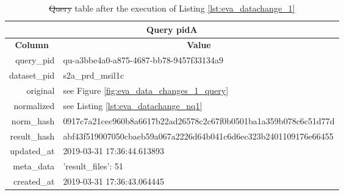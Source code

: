 \documentclass[draft,final]{vutinfth} %
\providecommand{\DIFaddtex}[1]{{\protect\color{blue}\uwave{#1}}} %
\providecommand{\DIFdeltex}[1]{{\protect\color{red}\sout{#1}}}                      %
\providecommand{\DIFaddFL}[1]{\DIFadd{#1}} %
\providecommand{\DIFdelFL}[1]{\DIFdel{#1}} %
\providecommand{\DIFaddbeginFL}{} %
\providecommand{\DIFaddendFL}{} %
\providecommand{\DIFdelbeginFL}{} %
\providecommand{\DIFdelendFL}{} %
\providecommand{\DIFadd}[1]{\texorpdfstring{\DIFaddtex{#1}}{#1}} %
\providecommand{\DIFdel}[1]{\texorpdfstring{\DIFdeltex{#1}}{}} %
\begin{document}
\begin{enumerate}

	\begin{table}[]
		\caption{\DIFdelbeginFL \DIFdelFL{Query }\DIFdelendFL \DIFaddbeginFL \textit{\DIFaddFL{Query}} \DIFaddendFL table after the execution of Listing \ref{lst:eva_datachange_1}}
		\centering
		\begin{tabular}{|r|l|}
			\hline \multicolumn{2}{|c|}{\textbf{Query pidA}} \\
			\hline \multicolumn{1}{|c|}{\textbf{Column}}  &  \multicolumn{1}{c|}{\textbf{Value}} \\ \hline
			query\_pid & qu-a3bbe4a0-a875-4687-bb78-9457f33134a9  \\ 
			dataset\_pid & s2a\_prd\_msil1c  \\ 
			original & see Figure \ref{fig:eva_data_changes_1_query}   \\
			normalized & see Listing \ref{lst:eva_datachange_nq1}  \\
			norm\_hash & 0917c7a21cec960b8a6617b22ad26578c2c67f0b0501ba1a359b078c6c51d77d  \\
			result\_hash & abf43f519007050cbaeb59a067a2226d64b041c6d6ec323b2401109176e66455   \\
			updated\_at & 2019-03-31 17:36:44.613893   \\
			meta\_data & {'result\_files': 51}  \\
			created\_at & 2019-03-31 17:36:43.064445   \\ \hline
		\end{tabular}
		\label{Tab:eva_datachanges1}
	\end{table}
\end{enumerate}
\end{document}
